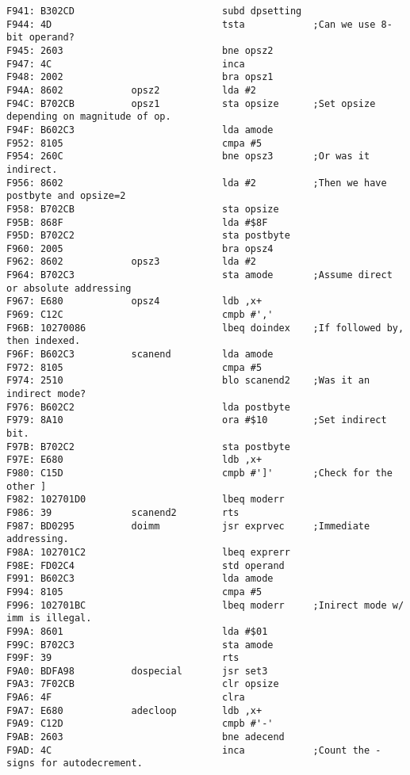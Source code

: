 {\begin{verbatim}
F941: B302CD                          subd dpsetting  
F944: 4D                              tsta            ;Can we use 8-bit operand?
F945: 2603                            bne opsz2
F947: 4C                              inca            
F948: 2002                            bra opsz1
F94A: 8602            opsz2           lda #2
F94C: B702CB          opsz1           sta opsize      ;Set opsize depending on magnitude of op.
F94F: B602C3                          lda amode
F952: 8105                            cmpa #5
F954: 260C                            bne opsz3       ;Or was it indirect.
F956: 8602                            lda #2          ;Then we have postbyte and opsize=2
F958: B702CB                          sta opsize
F95B: 868F                            lda #$8F
F95D: B702C2                          sta postbyte    
F960: 2005                            bra opsz4
F962: 8602            opsz3           lda #2
F964: B702C3                          sta amode       ;Assume direct or absolute addressing 
F967: E680            opsz4           ldb ,x+         
F969: C12C                            cmpb #','
F96B: 10270086                        lbeq doindex    ;If followed by, then indexed.
F96F: B602C3          scanend         lda amode
F972: 8105                            cmpa #5
F974: 2510                            blo scanend2    ;Was it an indirect mode?
F976: B602C2                          lda postbyte
F979: 8A10                            ora #$10        ;Set indirect bit.
F97B: B702C2                          sta postbyte
F97E: E680                            ldb ,x+         
F980: C15D                            cmpb #']'       ;Check for the other ]
F982: 102701D0                        lbeq moderr
F986: 39              scanend2        rts
F987: BD0295          doimm           jsr exprvec     ;Immediate addressing.  
F98A: 102701C2                        lbeq exprerr
F98E: FD02C4                          std operand
F991: B602C3                          lda amode
F994: 8105                            cmpa #5
F996: 102701BC                        lbeq moderr     ;Inirect mode w/ imm is illegal.
F99A: 8601                            lda #$01
F99C: B702C3                          sta amode
F99F: 39                              rts
F9A0: BDFA98          dospecial       jsr set3
F9A3: 7F02CB                          clr opsize
F9A6: 4F                              clra
F9A7: E680            adecloop        ldb ,x+
F9A9: C12D                            cmpb #'-'
F9AB: 2603                            bne adecend
F9AD: 4C                              inca            ;Count the - signs for autodecrement.

\end{verbatim}}

